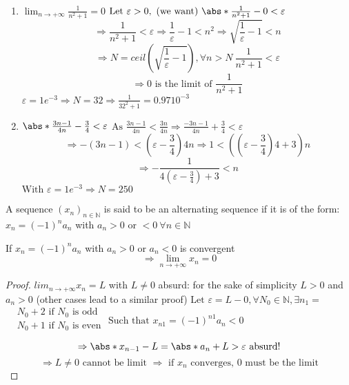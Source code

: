\documentclass[12pt, a4paper]{book}
\begin{document}
\begin{exmp} \
  \begin{enumerate}[label=\alph*]
    \item $\lim_{n \rightarrow +\infty} \frac{1}{n^2+1}=0$ \newline
    $\text{Let } \varepsilon >0, \text{ (we want) }\abs*{\frac{1}{n^2+1}-0}< \varepsilon$
    $$\Rightarrow \frac{1}{n^2+1}< \varepsilon \Rightarrow \frac{1}{\varepsilon}-1 < n^2 \Rightarrow \sqrt{\frac{1}{\varepsilon}-1}<n$$
    $$\Rightarrow N=ceil(\sqrt{\frac{1}{\varepsilon}-1}), \forall n >N \ \frac{1}{n^2+1}< \varepsilon$$
    $$\Rightarrow 0 \text{ is the limit of } \frac{1}{n^2+1}$$
    $\varepsilon = 1e^{-3} \Rightarrow N=32 \Rightarrow \frac{1}{32^2+1}=0.9710^{-3}$

    \item  $\abs*{\frac{3n-1}{4n}-\frac{3}{4}} < \varepsilon$ \newline
    $\text{As } \frac{3n-1}{4n} < \frac{3n}{4n} \Rightarrow \frac{-3n-1}{4n} + \frac{3}{4} < \varepsilon$
    $$\Rightarrow -(3n-1) < (\varepsilon -\frac{3}{4})4n \Rightarrow 1< ((\varepsilon -\frac{3}{4})4+3)n$$
    $$\Rightarrow -\frac{1}{4(\varepsilon -\frac{3}{4})+3} < n$$
    $\text{With } \varepsilon=1e^{-3} \Rightarrow N=250$
  \end{enumerate}
\end{exmp}

\begin{defn} A sequence $(x_n)_{n\in \mathbb{N}}$ is said to be an alternating sequence if it is of the form: $x_n=(-1)^n a_n$ with $a_n>0$ or $<0 \ \forall n \in \mathbb{N}$
\end{defn}

\begin{exmp} If $x_n=(-1)^n a_n$ with $a_n>0$ or $a_n<0$ is convergent 
  $$\Rightarrow \lim_{n \rightarrow +\infty} x_n=0$$
\end{exmp}

\begin{proof}
  $lim_{n \rightarrow +\infty} x_n =L$ with $L \neq 0$ absurd: for the sake of simplicity $L>0$ and $a_n>0$ (other cases lead to a similar proof) \newline
  $\text{Let } \varepsilon=L-0, \forall N_0 \in \mathbb{N}, \exists n_1=$
  $\begin{alignedat}{2}
    &N_0+2 \text{ if $N_0$ is odd}\\
    &N_0+1 \text{ if $N_0$ is even}\\
  \end{alignedat}$ \newline
  $\text{Such that } x_{n1}=(-1)^{n1}a_n<0$
  $$\Rightarrow \abs*{x_{n-1}-L}= \abs*{a_n+L}> \varepsilon \text{ absurd!}$$
  $$\Rightarrow L\neq 0 \text{ cannot be limit } \Rightarrow \text{ if } x_n \text{ converges, $0$ must be the limit}$$
\end{proof}
\end{document}

